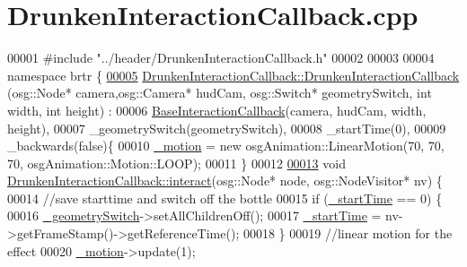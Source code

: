 \hypertarget{_drunken_interaction_callback_8cpp_source}{\section{Drunken\+Interaction\+Callback.\+cpp}
\label{_drunken_interaction_callback_8cpp_source}
}

\begin{DoxyCode}
00001 \textcolor{preprocessor}{#include "../header/DrunkenInteractionCallback.h"}
00002 
00003 
00004 \textcolor{keyword}{namespace }brtr \{
\hypertarget{_drunken_interaction_callback_8cpp_source_l00005}{}\hyperlink{classbrtr_1_1_drunken_interaction_callback_aa252ac5f3bc393ecb75784b98e17b5a5}{00005}     \hyperlink{classbrtr_1_1_drunken_interaction_callback_aa252ac5f3bc393ecb75784b98e17b5a5}{DrunkenInteractionCallback::DrunkenInteractionCallback}
      (osg::Node* camera,osg::Camera* hudCam, osg::Switch* geometrySwitch, \textcolor{keywordtype}{int} width, \textcolor{keywordtype}{int} height) :
00006     \hyperlink{classbrtr_1_1_base_interaction_callback}{BaseInteractionCallback}(camera, hudCam, width, height),
00007     \_geometrySwitch(geometrySwitch),
00008     \_startTime(0),
00009     \_backwards(false)\{
00010         \hyperlink{classbrtr_1_1_drunken_interaction_callback_adaa3e659a9f6516a5b59a43813506a11}{\_motion} = \textcolor{keyword}{new} osgAnimation::LinearMotion(70, 70, 70, osgAnimation::Motion::LOOP);
00011     \}
00012 
\hypertarget{_drunken_interaction_callback_8cpp_source_l00013}{}\hyperlink{classbrtr_1_1_drunken_interaction_callback_a86e4062f00a33768f752c1c5fa50c291}{00013}     \textcolor{keywordtype}{void} \hyperlink{classbrtr_1_1_drunken_interaction_callback_a86e4062f00a33768f752c1c5fa50c291}{DrunkenInteractionCallback::interact}(osg::Node* node, 
      osg::NodeVisitor* nv) \{
00014         \textcolor{comment}{//save starttime and switch off the bottle}
00015         \textcolor{keywordflow}{if} (\hyperlink{classbrtr_1_1_drunken_interaction_callback_ab1a42a563e42cfd1d480741b30e22245}{\_startTime} == 0) \{
00016             \hyperlink{classbrtr_1_1_drunken_interaction_callback_a0aa1983e0fc1cb720badb80464a8e391}{\_geometrySwitch}->setAllChildrenOff();
00017             \hyperlink{classbrtr_1_1_drunken_interaction_callback_ab1a42a563e42cfd1d480741b30e22245}{\_startTime} = nv->getFrameStamp()->getReferenceTime();
00018         \}
00019         \textcolor{comment}{//linear motion for the effect}
00020         \hyperlink{classbrtr_1_1_drunken_interaction_callback_adaa3e659a9f6516a5b59a43813506a11}{\_motion}->update(1);

\end{DoxyCode}
